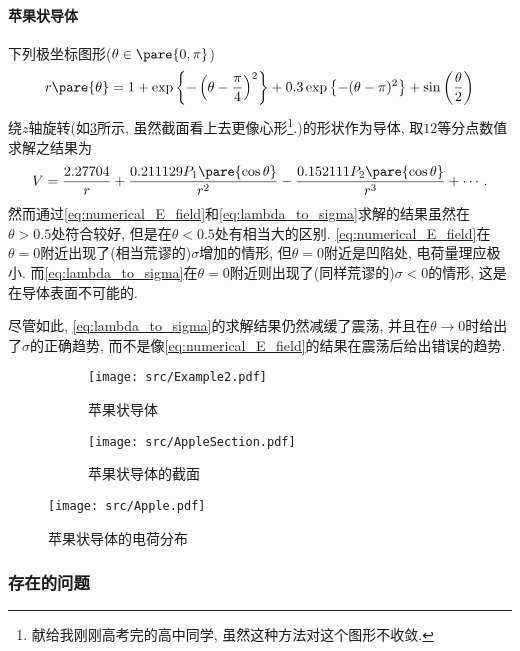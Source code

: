 \documentclass[hidelinks]{ctexart}
\begin{document}
\paragraph{苹果状导体}
下列极坐标图形($\theta\in\pare{0,\pi}$)
\[ r\pare{\theta} = 1 + \exp \left\{-\left(\theta-\frac{\pi }{4}\right)^2\right\}+0.3 \exp \left\{-(\theta-\pi )^2\right\}+\sin \left(\frac{\theta}{2}\right) \]
绕$z$轴旋转(如\cref{fig:苹果状导体的形状}所示, 虽然截面看上去更像心形\footnote{献给我刚刚高考完的高中同学, 虽然这种方法对这个图形不收敛.}.)的形状作为导体, 取$12$等分点数值求解之结果为
\[ V = \frac{2.27704}{r}+\frac{0.211129 P_1\pare{\cos\theta}}{r^2}-\frac{0.152111 P_2\pare{\cos\theta}}{r^3} + \cdots. \]
然而通过\eqref{eq:numerical_E_field}和\eqref{eq:lambda_to_sigma}求解的结果虽然在$\theta>0.5$处符合较好, 但是在$\theta<0.5$处有相当大的区别. \eqref{eq:numerical_E_field}在$\theta=0$附近出现了(相当荒谬的)$\sigma$增加的情形, 但$\theta=0$附近是凹陷处, 电荷量理应极小. 而\eqref{eq:lambda_to_sigma}在$\theta=0$附近则出现了(同样荒谬的)$\sigma < 0$的情形, 这是在导体表面不可能的.
\par
尽管如此, \eqref{eq:lambda_to_sigma}的求解结果仍然减缓了震荡, 并且在$\theta\rightarrow 0$时给出了$\sigma$的正确趋势, 而不是像\eqref{eq:numerical_E_field}的结果在震荡后给出错误的趋势.

\begin{figure}[H]
    \centering
    \begin{subfigure}[t]{.35\textwidth}
        \centering
        \texttt{[image: src/Example2.pdf]}
        \caption{苹果状导体}
        \label{fig:苹果状导体}
    \end{subfigure}
    \begin{subfigure}[t]{.62\textwidth}
        \centering
        \texttt{[image: src/AppleSection.pdf]}
        \caption{苹果状导体的截面}
        \label{fig:苹果状导体的截面}
    \end{subfigure}
    \caption{}
    \label{fig:苹果状导体的形状}
\end{figure}

\begin{figure}[H]
    \centering
    \texttt{[image: src/Apple.pdf]}
    \caption{苹果状导体的电荷分布}
    \label{fig:苹果状导体的电荷分布}
\end{figure}


\subsubsection*{存在的问题} %
\label{ssub:存在的问题}
\end{document}
